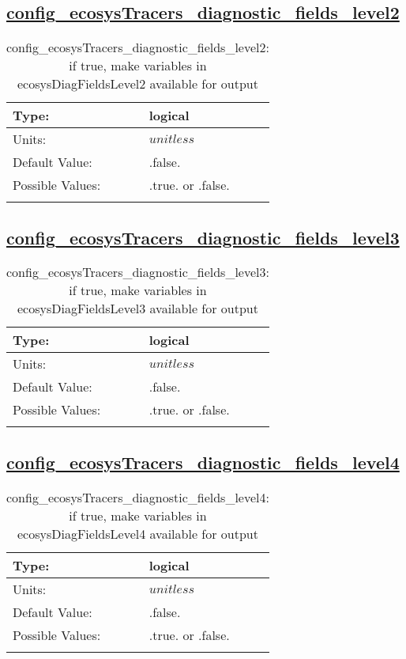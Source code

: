 \subsection[config\_ecosysTracers\_diagnostic\_fields\_level2]{\hyperref[sec:nm_tab_tracer_forcing_ecosysTracers]{config\_ecosysTracers\_diagnostic\_fields\_level2}}
\label{subsec:nm_sec_config_ecosysTracers_diagnostic_fields_level2}
\begin{center}
\begin{longtable}{| p{2.0in} || p{4.0in} |}
    \hline
    Type: & logical \\
    \hline
    Units: & $unitless$ \\
    \hline
    Default Value: & .false. \\
    \hline
    Possible Values: & .true. or .false. \\
    \hline
    \caption{config\_ecosysTracers\_diagnostic\_fields\_level2: if true, make variables in ecosysDiagFieldsLevel2 available for output}
\end{longtable}
\end{center}
\subsection[config\_ecosysTracers\_diagnostic\_fields\_level3]{\hyperref[sec:nm_tab_tracer_forcing_ecosysTracers]{config\_ecosysTracers\_diagnostic\_fields\_level3}}
\label{subsec:nm_sec_config_ecosysTracers_diagnostic_fields_level3}
\begin{center}
\begin{longtable}{| p{2.0in} || p{4.0in} |}
    \hline
    Type: & logical \\
    \hline
    Units: & $unitless$ \\
    \hline
    Default Value: & .false. \\
    \hline
    Possible Values: & .true. or .false. \\
    \hline
    \caption{config\_ecosysTracers\_diagnostic\_fields\_level3: if true, make variables in ecosysDiagFieldsLevel3 available for output}
\end{longtable}
\end{center}
\subsection[config\_ecosysTracers\_diagnostic\_fields\_level4]{\hyperref[sec:nm_tab_tracer_forcing_ecosysTracers]{config\_ecosysTracers\_diagnostic\_fields\_level4}}
\label{subsec:nm_sec_config_ecosysTracers_diagnostic_fields_level4}
\begin{center}
\begin{longtable}{| p{2.0in} || p{4.0in} |}
    \hline
    Type: & logical \\
    \hline
    Units: & $unitless$ \\
    \hline
    Default Value: & .false. \\
    \hline
    Possible Values: & .true. or .false. \\
    \hline
    \caption{config\_ecosysTracers\_diagnostic\_fields\_level4: if true, make variables in ecosysDiagFieldsLevel4 available for output}
\end{longtable}
\end{center}
